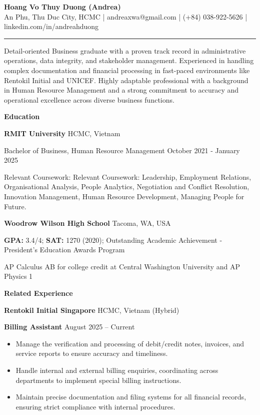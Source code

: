 \documentclass[10pt]{article}
\begin{document}
\begin{center}
    \textbf{Hoang Vo Thuy Duong (Andrea)}\\ 
    An Phu, Thu Duc City, HCMC | andreaxwa@gmail.com | (+84) 038-922-5626 | linkedin.com/in/andreahduong
\noindent\rule{\textwidth}{0.7pt}\end{center}

Detail-oriented Business graduate with a proven track record in administrative operations, data integrity, and stakeholder management. Experienced in handling complex documentation and financial processing in fast-paced environments like Rentokil Initial and UNICEF. Highly adaptable professional with a background in Human Resource Management and a strong commitment to accuracy and operational excellence across diverse business functions.

\begin{center}
    \textbf{Education}
\end{center}
\textbf{RMIT University} \hfill HCMC, Vietnam

Bachelor of Business, Human Resource Management \hfill October 2021 - January 2025

Relevant Coursework: Relevant Coursework: Leadership, Employment Relations, Organisational Analysis, People Analytics, Negotiation and Conflict
Resolution, Innovation Management, Human Resource Development, Managing People for Future.

\vspace{12pt}

\textbf{Woodrow Wilson High School} \hfill	Tacoma, WA, USA

\textbf{GPA:} 3.4/4; \textbf{SAT:} 1270 (2020); Outstanding Academic Achievement - President's Education Awards Program

AP Calculus AB for college credit at Central Washington University and AP Physics 1

\begin{center}
    \textbf{Related Experience}
\end{center}
\textbf{Rentokil Initial Singapore} \hfill HCMC, Vietnam (Hybrid)

\textbf{Billing Assistant} \hfill August 2025 – Current 
\begin{itemize}[noitemsep, topsep=0pt, partopsep=0pt, parsep=0pt]
    \item Manage the verification and processing of debit/credit notes, invoices, and service reports to ensure accuracy and timeliness.
    \item Handle internal and external billing enquiries, coordinating across departments to implement special billing instructions.
    \item Maintain precise documentation and filing systems for all financial records, ensuring strict compliance with internal procedures.
\end{itemize}
\vspace{12pt}
\end{document}
